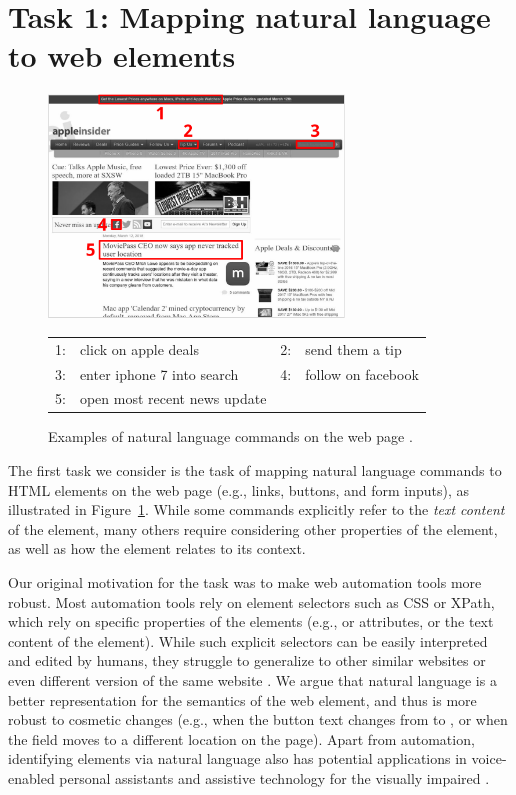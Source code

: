 \section{Task 1: Mapping natural language to web elements}
\label{sec:webrep}

\begin{figure}[t]
\centering
\includegraphics[width=0.7\textwidth]{figures/webrep/emnlp18-main-figure-alt.pdf}\\[.5em]
\begin{tabular}{@{}r@{\;}lr@{\;}l@{}}
1: & click on apple deals &
2: & send them a tip \\
3: & enter iphone 7 into search &
4: & follow on facebook \\
5: & open most recent news update \\
\end{tabular}
\caption{Examples of natural language commands on the web page .}
\label{fig:webrep-running-ex}
\end{figure}

The first task we consider is the task of mapping
natural language commands to HTML elements on the web page
(e.g., links, buttons, and form inputs),
as illustrated in Figure~\ref{fig:webrep-running-ex}.
While some commands explicitly refer to the \emph{text content}
of the element, many others require considering other properties
of the element, as well as how the element relates to its context.

Our original motivation for the task was to make
web automation tools more robust.
Most automation tools rely on element selectors
such as CSS or XPath,
which rely on specific properties of the elements
(e.g.,  or  attributes,
or the text content of the element).
While such explicit selectors can be easily interpreted
and edited by humans,
they struggle to generalize to other similar websites
or even different version of the same website
\cite{hammoudi2016why}.
We argue that natural language is a better
representation for the semantics of the web element,
and thus is more robust to cosmetic changes
(e.g., when the button text changes from  to ,
or when the  field moves to a different location on the page).
Apart from automation,
identifying elements via natural language
also has potential applications in
voice-enabled personal assistants
and assistive technology for the visually impaired
\cite{zajicek1998blind,ashok2014wizard}.

